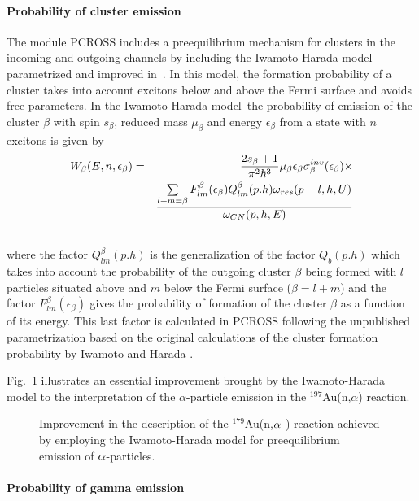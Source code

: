 \paragraph{Probability of cluster emission}

The module PCROSS includes a preequilibrium mechanism for clusters in the
incoming and outgoing channels by including the Iwamoto-Harada model~\cite{Iwamoto:82} parametrized and improved in~\cite{Sato:83,Shang:88,Shang:89}. In this
model, the formation probability of a cluster takes into account excitons
below and above the Fermi surface and avoids free parameters. In the
Iwamoto-Harada model~the probability of emission of the cluster $\beta $
with spin $s_{\beta }$, reduced mass $\mu _{\beta }$ and energy $\epsilon
_{\beta }$ from a state with $n$ excitons is given by%
\begin{eqnarray}
W_{\beta }(E,n,\epsilon _{\beta })&=&\frac{2s_{\beta }+1}{\pi ^{2}\hbar ^{3}}%
\mu _{\beta }\epsilon _{\beta }\sigma _{\beta }^{inv}(\epsilon _{\beta
})\times   \notag \\
&&\frac{\sum\limits_{l+m=\beta }F_{lm}^{\beta }(\epsilon _{\beta
})Q_{lm}^{\beta }(p.h)\omega _{res}(p-l,h,U)}{\omega _{CN}(p,h,E)} \notag \\
&&
\end{eqnarray}%
where the factor $Q_{lm}^{\beta }(p.h)$ is the generalization of the factor $%
Q_{b}(p.h)$ which takes into account the probability of the outgoing cluster
$\beta $ being formed with $l$ particles situated above and $m$ below the
Fermi surface ($\beta =l+m$) \cite{Shang:89} and the factor $F_{lm}^{\beta
}(\epsilon _{\beta })$ gives the probability of formation of the cluster $%
\beta $ as a function of its energy. This last factor is calculated in
PCROSS following the unpublished parametrization based on the original
calculations of the cluster formation probability by Iwamoto and Harada \cite{Iwamoto:82}.

Fig.~\ref{goldna} illustrates an essential
improvement brought by the Iwamoto-Harada model to the interpretation of the $\alpha$-particle emission in the $^{197}$Au(n,$\alpha $) reaction.
\begin{figure}[tbph]
\caption{Improvement in the description of the $^{179}$Au(n,$\protect\alpha $%
) reaction achieved by employing the Iwamoto-Harada model for preequilibrium
emission of $\protect\alpha $-particles.}
\label{goldna}
\end{figure}

\paragraph{Probability of gamma emission}

